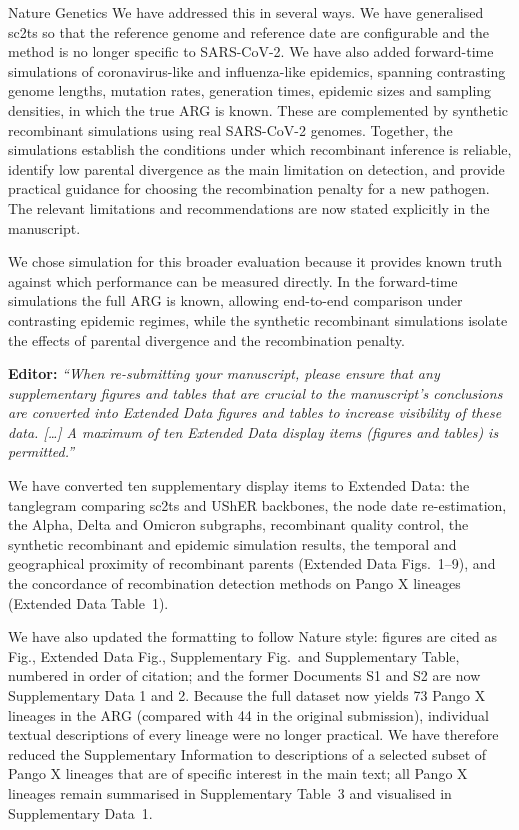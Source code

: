 \documentclass{letter}
\begin{document}
\begin{letter}{Nature Genetics}
We have addressed this in several ways. We have generalised sc2ts so that the
reference genome and reference date are configurable and the method is no
longer specific to SARS-CoV-2. We have also added forward-time simulations of
coronavirus-like and influenza-like epidemics, spanning contrasting genome
lengths, mutation rates, generation times, epidemic sizes and sampling
densities, in which the true ARG is known. These are complemented by synthetic
recombinant simulations using real SARS-CoV-2 genomes. Together, the
simulations establish the conditions under which recombinant inference is
reliable, identify low parental divergence as the main limitation on detection,
and provide practical guidance for choosing the recombination penalty for a new
pathogen. The relevant limitations and recommendations are now stated
explicitly in the manuscript.

We chose simulation for this broader evaluation because it provides known truth
against which performance can be measured directly. In the forward-time
simulations the full ARG is known, allowing end-to-end comparison under
contrasting epidemic regimes, while the synthetic recombinant simulations
isolate the effects of parental divergence and the recombination penalty.

\noindent \textbf{Editor:} \textit{``When re-submitting your manuscript, please ensure
that any supplementary figures and tables that are crucial to the manuscript's
conclusions are converted into Extended Data figures and tables to increase
visibility of these data. [\ldots] A maximum of ten Extended Data display items
(figures and tables) is permitted.''}

\noindent We have converted ten supplementary display items to Extended Data:
the tanglegram comparing sc2ts and UShER backbones,
the node date re-estimation,
the Alpha, Delta and Omicron subgraphs,
recombinant quality control,
the synthetic recombinant and epidemic simulation results,
the temporal and geographical proximity of recombinant parents
(Extended Data Figs.~1--9),
and the concordance of recombination detection methods on Pango X lineages
(Extended Data Table~1).

\noindent We have also updated the formatting to follow Nature style:
figures are cited as Fig., Extended Data Fig., Supplementary Fig.\ and
Supplementary Table, numbered in order of citation;
and the former Documents S1 and S2 are now Supplementary Data 1 and 2.
Because the full dataset now yields 73 Pango X lineages in the ARG (compared
with 44 in the original submission), individual textual descriptions of every
lineage were no longer practical. We have therefore reduced the Supplementary
Information to descriptions of a selected subset of Pango X lineages that are of
specific interest in the main text; all Pango X lineages remain summarised in
Supplementary Table~3 and visualised in Supplementary Data~1.


\end{letter}
\end{document}
